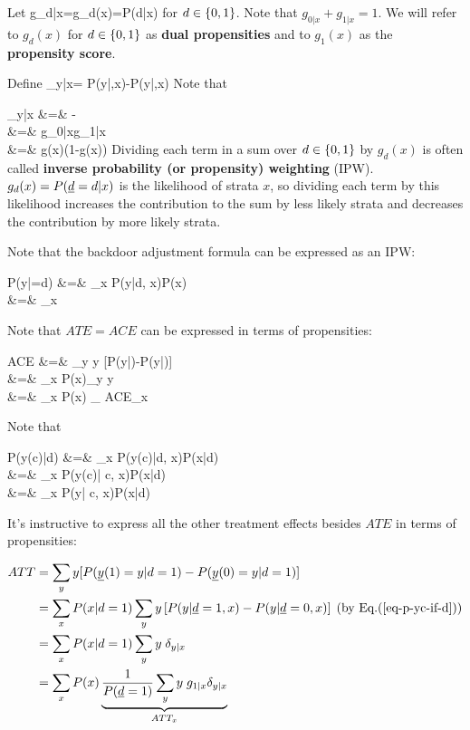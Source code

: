 Let
\beq
g_{d|x}=g_d(x)=P(d|x)
\eeq
 for $d\in\{0,1\}$.
Note that $g_{0|x}+g_{1|x}=1$.
We will
refer to $g_d(x)$
for $d\in \{0,1\}$
as {\bf dual propensities}
and to $g_1(x)$ as the
{\bf propensity score}.

Define
\beq
\delta_{y|x}=
P(y|,x)-P(y|,x)
\eeq
Note that

\beqa
\delta_{y|x}
&=&
-
\\
&=&
{
g_{0|x}g_{1|x}
}
\\
&=&
{
g(x)(1-g(x))
}
\eeqa
Dividing
each term
in a sum over $d\in \{0,1\}$
by $g_ d(x)$
is often called
 {\bf inverse probability (or propensity)
weighting} (IPW).
$g_ d(x)=P(\rvd= d|x)$ is the
likelihood of strata $x$,
so dividing each term by
this likelihood increases the
contribution to the sum
by less likely strata
and decreases the contribution by
more likely strata.




Note that the
backdoor adjustment formula
can  be expressed
as an IPW:



\beqa
P(y|\cald\rvd=d)
&=&
\sum_x P(y|d, x)P(x)
\\
&=&
\sum_x 
\eeqa

Note that $ATE=ACE$ can be expressed
in terms of propensities:



\beqa
ACE
&=&
\sum_y y [P(y|\cald{})-P(y|\cald{})]
\\
&=&
\sum_x P(x)\sum_y y
\left[
P(y|d=1,x)
-
P(y|d=0,x)
\right]
\\&=&
\sum_x P(x)
_
{ACE_x}
\label{eq-ace-propensity}
\eeqa



Note that

\beqa
P(y(c)|d)
&=&
\sum_x P(y(c)|d, x)P(x|d)
\\
&=&
\sum_x P(y(c)| c, x)P(x|d) \;
\\
&=&
\sum_x P(y| c, x)P(x|d)\;
\label{eq-p-yc-if-d}
\eeqa

It's
instructive
to express all the
other treatment effects besides
$ATE$ in terms of propensities:

\begin{align}
ATT
&=
 \sum_y y [P(\rvy(1)=y|d=1)
-P(\rvy(0)=y|d=1)]
\\
&=
\sum_x P(x|d=1)
\sum_y y
\left[
P(y|\rvd=1,x)
-
P(y|\rvd=0,x)
\right]
\;\text{(by Eq.(\ref{eq-p-yc-if-d}))}
\\
&=
\sum_x P(x|d=1)
\sum_y y \;\delta_{y|x}
\\
&=
\sum_x P(x)
\underbrace{
\frac{1}{P(\rvd=1)}
\sum_y y\; g_{1|x}\delta_{y|x}
}_
{ATT_x}
\end{align}


